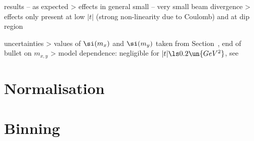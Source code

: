 \> results -- as expected
\>> effects in general small -- very small beam divergence
\>> effects only present at low $|t|$ (strong non-linearity due to Coulomb) and at dip region

\> uncertainties
\>> values of $\si(m_x)$ and $\si(m_y)$ taken from Section~, end of bullet on $m_{x,y}$
\>> model dependence: negligible for $|t| \ls 0.2\un{GeV^2}$, see 

\fi


\chapter[normalisation]{Normalisation}

\iffalse

\> method
\>> normalise $\d\si/\d t$ such that $I + S = 31.0\un{mb}$ (this value should be approved in a meeting on 23 Oct 2017)
\>> $I$ stands for $\d\si/\d t$ fit over $0.01 < |t| < 0.05\un{GeV^2}$, integrated over $0 < |t| < 0.01\un{GeV^2}$
\>> $S$ stands for histogram integral of bins $0.01 < |t| < 0.5\un{GeV^2}$

\fi



\chapter[binning]{Binning}

\iffalse

\> method: binning ``ob-$\langle n\rangle$-$\langle u\rangle$-$\langle w_m\rangle$`` is built as follows
\>> at low $|t|$ ($|t| \ls 0.4\un{GeV^2}$): bin size about $n\times \si(\hbox{$t$ smearing})$
\>> at mid $|t|$: bin size for a fixed statistical uncertainty $u\un{\%}$
\>> if needed at large $|t|$: constant bin size $w_m$ (in $\rm GeV^2$) to avoid excessively large bins

\> binnings used in analysis
\>> ob-1-20-0.05
\>> ob-2-10-0.05
\>> ob-3-5-0.05

\> \plot{binning/bin_size_vs_t.pdf} : visualisation of binning determinants vs.~several binnings used in
the analysis

\fi



